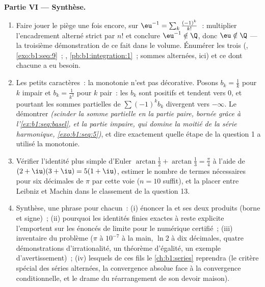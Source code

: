\begin{problem}
\medskip
\noindent\textbf{Partie VI --- Synthèse.}
\begin{enumerate}[resume]
  \item Faire jouer le piège une fois encore, sur $\eu^{-1} = \sum_k
        \frac{(-1)^k}{k!}$~: multiplier l'encadrement alterné
        strict par $n!$ et conclure $\eu^{-1} \notin \Q$,
        donc $\eu \notin \Q$ --- la troisième démonstration de ce
        fait dans le volume. Énumérer les trois (,
        \cref{exo:b1:seq:9}~; ,
        \cref{pb:b1:integration:1}~; sommes alternées, ici) et
        ce dont chacune a eu besoin.
  \item Les petits caractères~: la monotonie n'est pas décorative.
        Posons $b_k = \frac1k$ pour $k$ impair et $b_k = \frac{1}{k^2}$
        pour $k$ pair~: les $b_k$ sont positifs et tendent vers $0$,
        et pourtant les sommes partielles de $\sum (-1)^k b_k$
        divergent vers $-\infty$. Le démontrer \emph{(scinder la
        somme partielle en la partie paire, bornée grâce à
        l'\cref{ex:b1:seq:basel}, et la partie impaire, qui
        domine la moitié de la série harmonique,
        \cref{exo:b1:seq:5})}, et dire exactement quelle étape de
        la question 1 a utilisé la monotonie.
  \item Vérifier l'identité plus simple d'Euler $\arctan\frac12 +
        \arctan\frac13 = \frac\pi4$ à l'aide de $(2 + \iu)(3 + \iu) =
        5(1 + \iu)$, estimer le nombre de termes nécessaires pour six
        décimales de $\pi$ par cette voie ($n = 10$ suffit), et la
        placer entre Leibniz et Machin dans le classement de la
        question 13.
  \item Synthèse, une phrase pour chacun~: (i) énoncer la  et ses deux produits (borne et signe)~; (ii)
        pourquoi les identités finies exactes à reste explicite
        l'emportent sur les énoncés de limite pour le numérique
        certifié~; (iii) inventaire du problème ($\pi$ à $10^{-7}$
        à la main, $\ln 2$ à dix décimales, quatre démonstrations
        d'irrationalité, un théorème d'égalité, un exemple
        d'avertissement)~; (iv) lesquels de ces fils le
        \cref{ch:b1:series} reprendra (le critère spécial des séries
        alternées, la convergence absolue face à la convergence
        conditionnelle, et le drame du réarrangement de son devoir
        maison).
\end{enumerate}
\end{problem}
